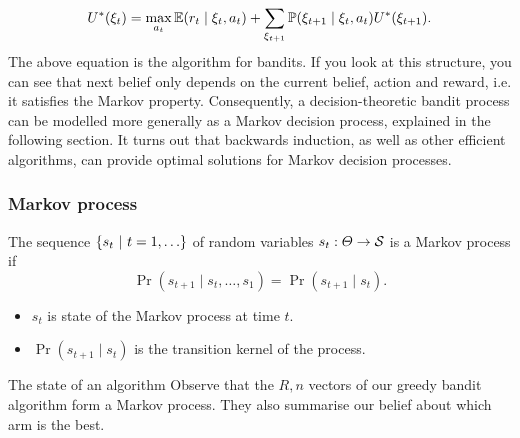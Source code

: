 \documentclass[9pt]{beamer}
\begin{document}
{  \begin{equation}
    U^*(\xi_t) = \max_{a_t} \mathop{\mbox{\ensuremath{\mathbb{E}}}}\nolimits(r_t \mid \xi_t, a_t) + \sum_{\xi_{t+1}} \mathop{\mbox{\ensuremath{\mathbb{P}}}}\nolimits(\xi_{t+1} \mid \xi_t, a_t) U^*(\xi_{t+1}).\label{eq:backwards-induction-bandits}
  \end{equation}
  The above equation is the  algorithm for bandits.  If you look at this structure, you can see that  next belief only depends on the current belief, action and reward, i.e. it satisfies the Markov property. Consequently, a decision-theoretic bandit process can be modelled more generally as a Markov decision process, explained in the following section. It turns out that backwards induction, as well as other efficient algorithms, can provide optimal solutions for Markov decision processes.
}


\begin{frame}
  \frametitle{Markov process}
  \begin{figure}
  \end{figure}

  \begin{definition}
    The sequence $\left\{s_t ~\middle|~ t=1,\ldots\right\}$ of random variables $s_t : \Theta \to {\mathcal{S}}$ is a Markov process if
    \begin{equation}
      \label{eq:markov-chain}
      \Pr(s_{t+1} \mid s_{t}, \ldots, s_1) 
      =
      \Pr(s_{t+1} \mid s_{t}). 
    \end{equation}
    \begin{itemize}
    \item $s_t$ is \alert{state} of the Markov process at
      time $t$.
    \item $\Pr(s_{t+1} \mid s_t)$ is the \alert{transition kernel} of the process.
    \end{itemize}
  \end{definition}
  
  \begin{alertblock}{The state of an algorithm}
    Observe that the $R, n$ vectors of our greedy bandit algorithm form a Markov process. They also summarise our belief about which arm is the best.
  \end{alertblock}
\end{frame}
\end{document}
